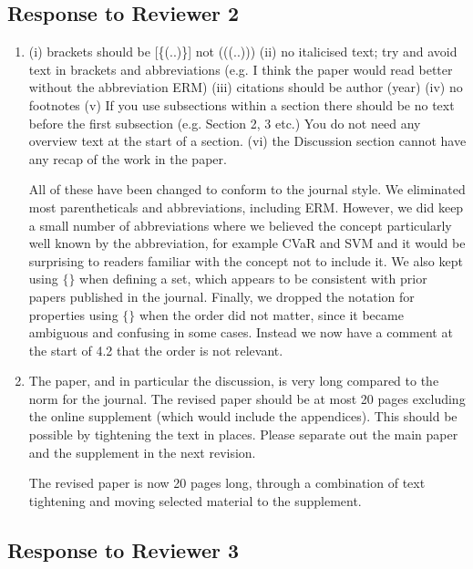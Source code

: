 \documentclass[a4paper]{article}
\begin{document}
\subsection*{Response to Reviewer 2}

\begin{enumerate}

\item (i) brackets should be [\{(..)\}] not (((..)))
(ii) no italicised text; try and avoid text in brackets and abbreviations (e.g. I think the paper would read better without the abbreviation ERM)
(iii) citations should be author (year)
(iv) no footnotes
(v) If you use subsections within a section there should be no text before the first subsection (e.g. Section 2, 3 etc.) You do not need any overview text at the start of a section.
(vi) the Discussion section cannot have any recap of the work in the paper.

All of these have been changed to conform to the journal style.  We eliminated most parentheticals and abbreviations, including ERM.  However, we did keep a small number of abbreviations where we believed the concept particularly well known by the abbreviation, for example CVaR and SVM and it would be surprising to readers familiar with the concept not to include it.  We also kept using $\{\}$ when defining a set, which appears to be consistent with prior papers published in the journal.  Finally, we dropped the notation for properties using $\{\}$ when the order did not matter, since it became ambiguous and confusing in some cases.  Instead we now have a comment at the start of 4.2 that the order is not relevant.

\item The paper, and in particular the discussion, is very long compared to the norm for the journal. The revised paper should be at most 20 pages excluding the online supplement (which would include the appendices). This should be possible by tightening the text in places. Please separate out the main paper and the supplement in the next revision.

The revised paper is now 20 pages long, through a combination of text tightening and moving selected material to the supplement.

\end{enumerate}

\subsection*{Response to Reviewer 3}
\end{document}
